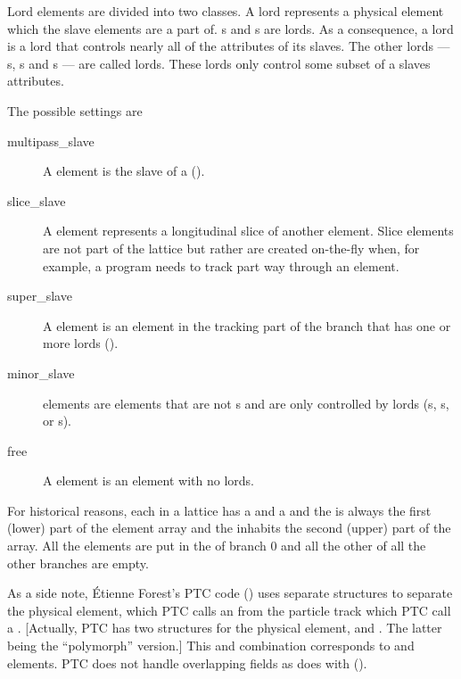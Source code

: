 Lord elements are divided into two classes. 
A  lord represents a physical element which the slave elements are a part of.
s and s are  lords. 
As a consequence, a  lord is a lord that
controls nearly all of the attributes of its slaves. 
The other lords --- s, s and 
s --- are called  lords.
These lords only control some subset of a slaves attributes.

The possible  settings are
  \begin{description}
  \item[multipass_slave]\Newline
A  element is the slave of a 
().
  \item[slice_slave]\Newline
A  element represents a longitudinal slice of another element.
Slice elements are not part of the lattice but rather are created on-the-fly
when, for example, a program needs to track part way through an element.
  \item[super_slave]\Newline 
A  element is an element in the tracking part of the branch that 
has one or more  lords ().
  \item[minor_slave]\Newline
{} elements are elements that are not s and are only controlled
by  lords (s, s, or s).
  \item[free]\Newline
A  element is an element with no lords.
  \end{description}

For historical reasons, each  in a lattice has a  and a  and the  is always the first (lower) part of the element array and the
 inhabits the second (upper) part of the array.  All the  elements are put
in the  of branch 0 and all the other  of all the other branches
are empty.

As a side note, \'Etienne Forest's PTC code () uses separate structures to
separate the physical element, which PTC calls an  from the particle track which PTC
call a .  [Actually, PTC has two structures for the physical element,  and
. The latter being the ``polymorph'' version.] This  and 
combination corresponds to \bmad {} and  elements. PTC does not
handle overlapping fields as \bmad does with  ().

